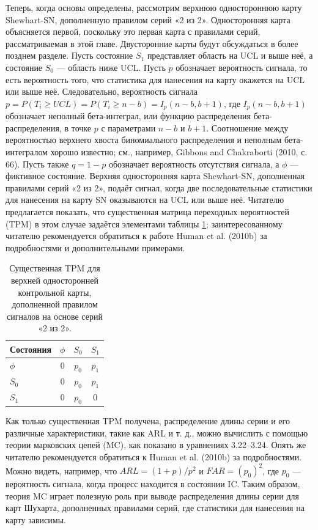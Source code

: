 Теперь, когда основы определены, рассмотрим верхнюю одностороннюю карту Shewhart-SN, дополненную правилом серий «2 из 2». Односторонняя карта объясняется первой, поскольку это первая карта с правилами серий, рассматриваемая в этой главе. Двусторонние карты будут обсуждаться в более позднем разделе. Пусть состояние \(S_1\) представляет область на UCL и выше неё, а состояние \(S_0\) --- область ниже UCL. Пусть \(p\) обозначает вероятность сигнала, то есть вероятность того, что статистика для нанесения на карту окажется на UCL или выше неё. Следовательно, вероятность сигнала \(p = P(T_i \ge UCL) = P(T_i \ge n - b) = I_p(n - b, b + 1)\), где \(I_p(n - b, b + 1)\) обозначает неполный бета-интеграл, или функцию распределения бета-распределения, в точке \(p\) с параметрами \(n - b\) и \(b + 1\). Соотношение между вероятностью верхнего хвоста биномиального распределения и неполным бета-интегралом хорошо известно; см., например, Gibbons and Chakraborti (2010, с. 66). Пусть также \(q = 1 - p\) обозначает вероятность отсутствия сигнала, а \(\phi\) --- фиктивное состояние. Верхняя односторонняя карта Shewhart-SN, дополненная правилами серий «2 из 2», подаёт сигнал, когда две последовательные статистики для нанесения на карту SN оказываются на UCL или выше неё. Читателю предлагается показать, что существенная матрица переходных вероятностей (TPM) в этом случае задаётся элементами таблицы \ref{tab:4.2}; заинтересованному читателю рекомендуется обратиться к работе Human et al. (2010b) за подробностями и дополнительными примерами.

\begin{table}[!ht]
	\centering
	\caption{Существенная TPM для верхней односторонней контрольной карты, дополненной правилом сигналов на основе серий «2 из 2».}
	\label{tab:4.2}
	\begin{tabular}{@{}lccc@{}}
		\toprule
		Состояния & \(\phi\) & \(S_0\) & \(S_1\) \\
		\midrule
		\(\phi\) & 0 & \(p_0\) & \(p_1\) \\
		\(S_0\) & 0 & \(p_0\) & \(p_1\) \\
		\(S_1\) & 0 & \(p_0\) & 0 \\
		\bottomrule
	\end{tabular}
\end{table}

Как только существенная TPM получена, распределение длины серии и его различные характеристики, такие как ARL и т. д., можно вычислить с помощью теории марковских цепей (MC), как показано в уравнениях 3.22--3.24. Опять же читателю рекомендуется обратиться к Human et al. (2010b) за подробностями. Можно видеть, например, что \(ARL = (1 + p)/p^2\) и \(FAR = (p_0)^2\), где \(p_0\) --- вероятность сигнала, когда процесс находится в состоянии IC. Таким образом, теория MC играет полезную роль при выводе распределения длины серии для карт Шухарта, дополненных правилами серий, где статистики для нанесения на карту зависимы.

